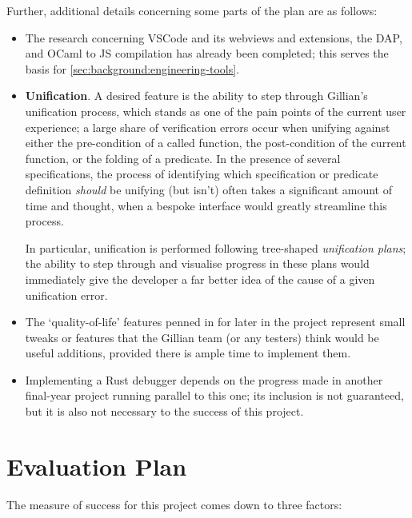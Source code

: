 Further, additional details concerning some parts of the plan are as follows:

\begin{itemize}
  \item The research concerning VSCode and its webviews and extensions, the
        DAP, and OCaml to JS compilation has already been completed; this
        serves the basis for \autoref{sec:background:engineering-tools}.

  \item \textbf{Unification}. A desired feature is the ability to step through
        Gillian's unification process, which stands as one of the pain points
        of the current user experience; a large share of verification errors
        occur when unifying against either the pre-condition of a called
        function, the post-condition of the current function, or the folding of a predicate. In the
        presence of several specifications, the process of identifying which
        specification or predicate definition \textit{should} be unifying (but isn't) often takes a
        significant amount of time and thought, when a bespoke interface would
        greatly streamline this process.

        In particular, unification is performed following tree-shaped
        \textit{unification plans}; the ability to step through and visualise
        progress in these plans would immediately give the developer a far
        better idea of the cause of a given unification error.

  \item The `quality-of-life' features penned in for later in the project
        represent small tweaks or features that the Gillian team (or any
        testers) think would be useful additions, provided there is ample time
        to implement them.

  \item Implementing a Rust debugger depends on the progress made in another
        final-year project running parallel to this one; its inclusion is not
        guaranteed, but it is also not necessary to the success of this project.

\end{itemize}

\section{Evaluation Plan} 

The measure of success for this project comes down to three factors:

